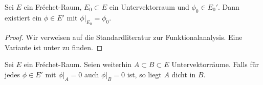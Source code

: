 \begin{thm}
  \label{thm:hahn-banach}
  Sei $E$ ein Fr\'echet-Raum, $E_0 \subset E$ ein Untervektorraum und
  $\phi_0 \in E_0'$. Dann existiert ein $\phi \in E'$ mit $\phi|_{E_0}
  = \phi_0$.
\end{thm}

\begin{proof}
  Wir verweisen auf die Standardliteratur zur Funktionalanalysis. Eine
  Variante ist unter \cite[Satz 3.6]{Rud} zu finden.
\end{proof}

\begin{cor}
  \label{cor:frechet-dicht}
  Sei $E$ ein Fr\'echet-Raum. Seien weiterhin $A \subset B \subset E$
  Untervektorräume. Falls für jedes $\phi \in E'$ mit $\phi|_A =
  0$ auch $\phi|_B = 0$ ist, so liegt $A$ dicht in $B$.
\end{cor}

